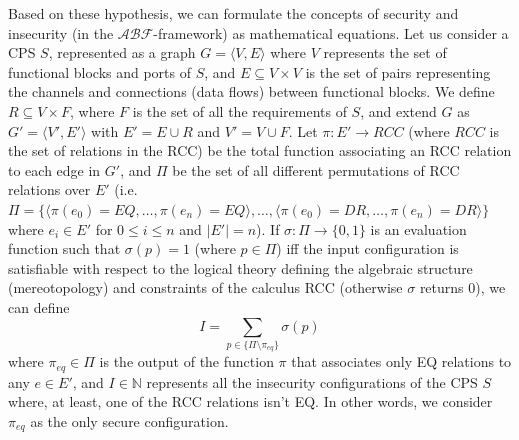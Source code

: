 \documentclass[conference]{IEEEtran}
\newcommand{\assertionRegion}{\mathcal{A}}
\newcommand{\beliefRegion}{\mathcal{B}}
\newcommand{\factRegion}{\mathcal{F}}
\newcommand{\abftheory}{\assertionRegion\beliefRegion\factRegion}
\begin{document}
Based on these hypothesis, we can formulate the concepts of security and
insecurity (in the $\abftheory$-framework) as mathematical equations.  Let us
consider a CPS $S$, represented as a graph $G=\langle V,E\rangle$ where $V$
represents the set of functional blocks and ports of $S$, and $E\subseteq
V\times V$ is the set of pairs representing the channels and connections (data
flows) between functional blocks. We define $R\subseteq V\times F$, where $F$
is the set of all the requirements of $S$, and extend $G$ as $G'=\langle V',E'\rangle$ with $E'= E\cup R$ and $V'=V\cup F$. Let $\pi:
E'\rightarrow RCC$ (where $RCC$ is the set of relations in the RCC) be the
total function associating an RCC relation to each edge in $G'$, and $\Pi$ be
the set of all different permutations of RCC relations over $E'$ (i.e.
$\Pi=\{\langle\pi(e_0)=EQ,\ldots,\pi(e_n)=EQ\rangle,\ldots,\langle
\pi(e_0)=DR,\ldots,\pi(e_n)=DR\rangle\}$ where $e_i\in E'$ for $0\leq i \leq n$ and $|E'|=n$). If $\sigma:\Pi\rightarrow\{0,1\}$ is
an evaluation function such that $\sigma(p)=1$ (where $p\in\Pi$) iff the input
configuration is satisfiable with respect to the logical theory defining the
algebraic structure (mereotopology) and constraints of the calculus RCC
(otherwise $\sigma$ returns $0$), we can define
\begin{displaymath}
	I=\sum_{p\in\{\Pi\setminus\pi_{eq}\}} \sigma(p)
\end{displaymath}
where $\pi_{eq}\in\Pi$ is the output of the function $\pi$ that associates only EQ relations
to any $e\in E'$, and $I\in\mathbb{N}$ represents all the insecurity configurations
of the CPS $S$ where, at least, one of the RCC relations isn't EQ.
In other words, we consider $\pi_{eq}$ as the only secure configuration.

%
\end{document}
